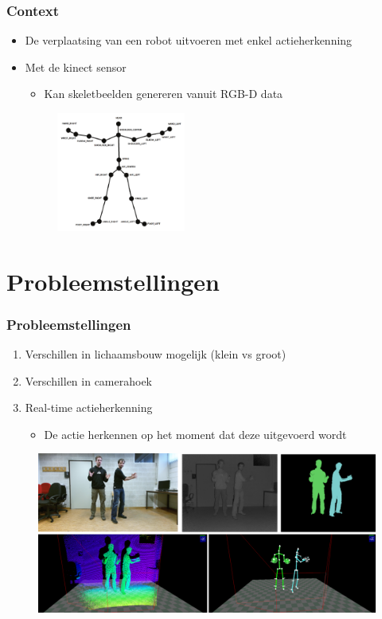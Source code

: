 \documentclass[]{beamer}
\begin{document}
	\begin{frame}\frametitle{Context}
		\begin{itemize}
			\item De verplaatsing van een robot uitvoeren met enkel actieherkenning
			\item<2-> Met de kinect sensor
			\begin{itemize}
				\item Kan skeletbeelden genereren vanuit RGB-D data
			\end{itemize}
			\begin{figure}
				\includegraphics[width=0.4\textwidth]{skeleton}
			\end{figure}	
		\end{itemize}
	\end{frame}

	\section{Probleemstellingen}
	\begin{frame}\frametitle{Probleemstellingen}
		\begin{enumerate}
			\item Verschillen in lichaamsbouw mogelijk (klein vs groot)
			\item Verschillen in camerahoek
			\item<2-> Real-time actieherkenning
			\begin{itemize}
				\item De actie herkennen op het moment dat deze uitgevoerd wordt
			\end{itemize} 
		\end{enumerate}
		\begin{figure}
			\includegraphics[width=\textwidth]{sensoren}
		\end{figure}
	\end{frame}
\end{document}
